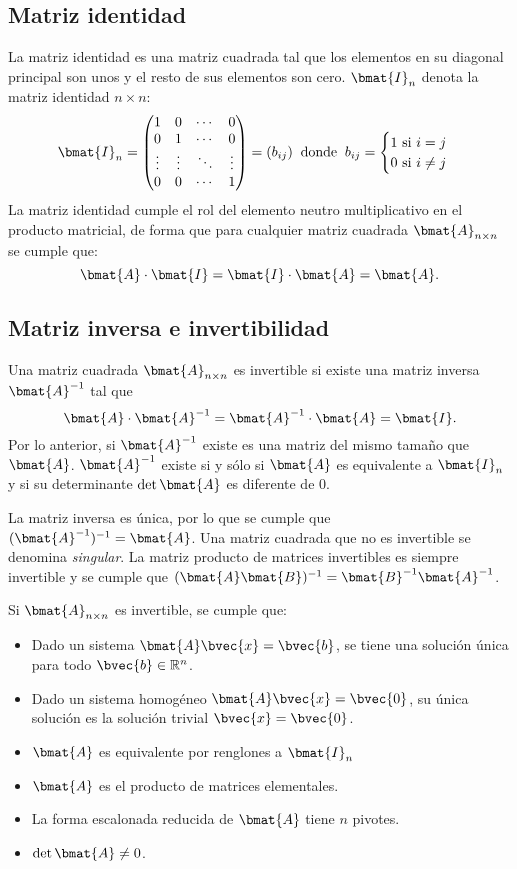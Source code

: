 \documentclass{fmbnotes}
\begin{document}
\subsection{Matriz identidad}

La matriz identidad es una matriz cuadrada tal que los elementos en su diagonal principal son unos y el resto de sus elementos son cero. \( \bmat{I}_n \) denota la matriz identidad \( n \times n \):
\[\bmat{I}_n=\begin{pmatrix}
1 & 0 & \cdots & 0 \\ 0 & 1 & \cdots & 0 \\ \vdots & \vdots & \ddots & \vdots \\ 0 & 0 & \cdots & 1
\end{pmatrix}=(b_{ij}) \: \text{ donde } \:  b_{ij}=\begin{cases}
1 \text{ si } i=j \\ 0 \text{ si } i \neq j
\end{cases}\]
La matriz identidad cumple el rol del elemento neutro multiplicativo en el producto matricial, de forma que para
cualquier matriz cuadrada \( \bmat{A}_{n \times n} \) se cumple que:
\[\bmat{A} \cdot \bmat{I} = \bmat{I} \cdot \bmat{A} = \bmat{A}.\]
\subsection{Matriz inversa e invertibilidad}
Una matriz cuadrada \( \bmat{A}_{n \times n} \) es invertible si existe una matriz inversa \(\bmat{A}^{-1}\) tal que
\[\bmat{A} \cdot \bmat{A}^{-1} = \bmat{A}^{-1} \cdot \bmat{A} = \bmat{I}.\]
Por lo anterior, si \( \bmat{A}^{-1} \) existe es una matriz del mismo tamaño que \( \bmat{A} \). \(\bmat{A}^{-1}\) existe si y sólo si \( \bmat{A} \) es equivalente a \(\bmat{I}_n\) y si su determinante \(\det \bmat{A}\) es diferente de 0.

La matriz inversa es única, por lo que se cumple que \((\bmat{A}^{-1})^{-1}=\bmat{A}\). Una matriz cuadrada que no es invertible se denomina \emph{singular}. La matriz producto de matrices invertibles es siempre invertible y se cumple que \((\bmat{A}\bmat{B})^{-1}=\bmat{B}^{-1}\bmat{A}^{-1}\).

Si \(\bmat{A}_{n\times n}\) es invertible, se cumple que:
\begin{itemize}
\item Dado un sistema  \(\bmat{A}\bvec{x}=\bvec{b}\), se tiene una solución única para todo \(\bvec{b} \in \mathbb{R}^{ n }\).
\item Dado un sistema homogéneo \(\bmat{A}\bvec{x}=\bvec{0}\), su única solución es la solución trivial \(\bvec{x}=\bvec{0}\). 
\item \( \bmat{A} \) es equivalente por renglones a \(\bmat{I}_n\)
\item \( \bmat{A} \) es el producto de matrices elementales.
\item La forma escalonada reducida de \( \bmat{A} \) tiene \( n \) pivotes.
\item \( \det \bmat{A} \neq 0 \).
\end{itemize}
\end{document}
